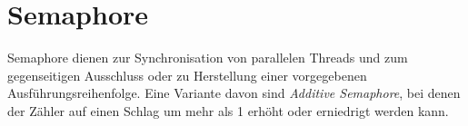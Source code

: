 \section{Semaphore}

Semaphore dienen zur Synchronisation von parallelen Threads und zum gegenseitigen Ausschluss oder zu Herstellung einer vorgegebenen Ausführungsreihenfolge.
Eine Variante davon sind \textit{Additive Semaphore}, bei denen der Zähler auf einen Schlag um mehr als 1 erhöht oder erniedrigt werden kann.
